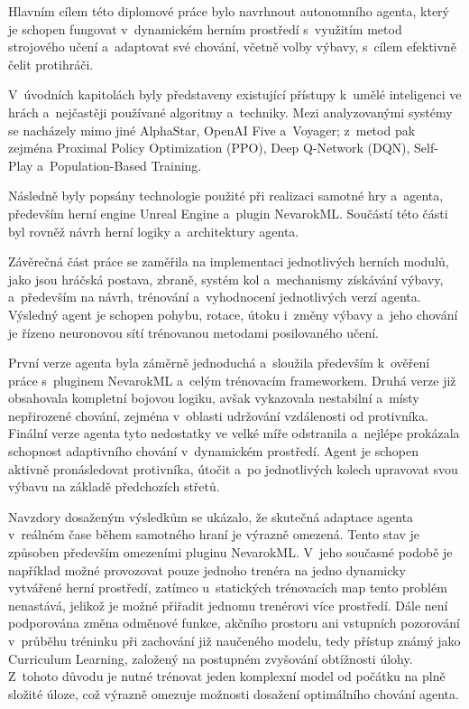 Hlavním cílem této diplomové práce bylo navrhnout autonomního agenta, který je schopen fungovat v~dynamickém herním prostředí s~využitím metod strojového učení a~adaptovat své chování, včetně volby výbavy, s~cílem efektivně čelit protihráči.

V~úvodních kapitolách byly představeny existující přístupy k~umělé inteligenci ve hrách a~nejčastěji používané algoritmy a~techniky. Mezi analyzovanými systémy se nacházely mimo jiné AlphaStar, OpenAI Five a~Voyager; z~metod pak zejména Proximal Policy Optimization (PPO), Deep Q-Network (DQN), Self-Play a~Population-Based Training.

Následně byly popsány technologie použité při realizaci samotné hry a~agenta, především herní engine Unreal Engine a~plugin NevarokML. Součástí této části byl rovněž návrh herní logiky a~architektury agenta.

Závěrečná část práce se zaměřila na implementaci jednotlivých herních modulů, jako jsou hráčská postava, zbraně, systém kol a~mechanismy získávání výbavy, a~především na návrh, trénování a~vyhodnocení jednotlivých verzí agenta. Výsledný agent je schopen pohybu, rotace, útoku i~změny výbavy a~jeho chování je řízeno neuronovou sítí trénovanou metodami posilovaného učení.

První verze agenta byla záměrně jednoduchá a~sloužila především k~ověření práce s~pluginem NevarokML a~celým trénovacím frameworkem. Druhá verze již obsahovala kompletní bojovou logiku, avšak vykazovala nestabilní a~místy nepřirozené chování, zejména v~oblasti udržování vzdálenosti od protivníka. Finální verze agenta tyto nedostatky ve velké míře odstranila a~nejlépe prokázala schopnost adaptivního chování v~dynamickém prostředí. Agent je schopen aktivně pronásledovat protivníka, útočit a~po jednotlivých kolech upravovat svou výbavu na základě předchozích střetů.

\newpage

Navzdory dosaženým výsledkům se ukázalo, že skutečná adaptace agenta v~reálném čase během samotného hraní je výrazně omezená. Tento stav je způsoben především omezeními pluginu NevarokML. V~jeho současné podobě je například možné provozovat pouze jednoho trenéra na jedno dynamicky vytvářené herní prostředí, zatímco u~statických trénovacích map tento problém nenastává, jelikož je možné přiřadit jednomu trenérovi více prostředí. Dále není podporována změna odměnové funkce, akčního prostoru ani vstupních pozorování v~průběhu tréninku při zachování již naučeného modelu, tedy přístup známý jako Curriculum Learning, založený na postupném zvyšování obtížnosti úlohy. Z~tohoto důvodu je nutné trénovat jeden komplexní model od počátku na plně složité úloze, což výrazně omezuje možnosti dosažení optimálního chování agenta.
